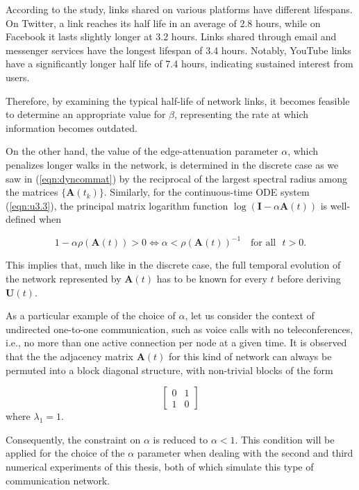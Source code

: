\newpage

According to the study, links shared on various platforms have different lifespans. On Twitter, a link reaches its half life in an average of 2.8 hours, while on Facebook it lasts slightly longer at 3.2 hours. Links shared through email and messenger services have the longest lifespan of 3.4 hours. Notably, YouTube links have a significantly longer half life of 7.4 hours, indicating sustained interest from users.

Therefore, by examining the typical half-life of network links, it becomes feasible to determine an appropriate value for $\beta$, representing the rate at which information becomes outdated.

On the other hand, the value of the edge-attenuation parameter $\alpha$, which penalizes longer walks in the network, is determined in the discrete case as we saw in (\ref{eqn:dyncommat}) by the reciprocal of the largest spectral radius among the matrices $\{\mathbf{A}(t_k)\}$. Similarly, for the continuous-time ODE system (\ref{eqn:u3.3}), the principal matrix logarithm function $\log (\mathbf{I} - \alpha \mathbf{A}(t))$ is well-defined when \cite[Ch.\ 11]{higham2008functions} 

$$1 - \alpha\rho(\mathbf{A}(t)) > 0 \iff \alpha < \rho(\mathbf{A}(t))^{-1} \text{~~~for all~~} t>0.$$

This implies that, much like in the discrete case, the full temporal evolution of the network represented by $\mathbf{A}(t)$ has to be known for every $t$ before deriving $\mathbf{U}(t)$.

As a particular example of the choice of $\alpha$, let us consider the context of undirected one-to-one communication, such as voice calls with no teleconferences, i.e., no more than one active connection per node at a given time. It is observed that the the adjacency matrix $\mathbf{A}(t)$ for this kind of network can always be permuted into a block diagonal structure, with non-trivial blocks of the form

$$\begin{bmatrix}
0 & 1\\
1 & 0 
\end{bmatrix}$$ where $\lambda_1=1$.

Consequently, the constraint on $\alpha$ is reduced to $\alpha<1$. This condition will be applied for the choice of the $\alpha$ parameter when dealing with the second and third numerical experiments of this thesis, both of which simulate this type of communication network.

